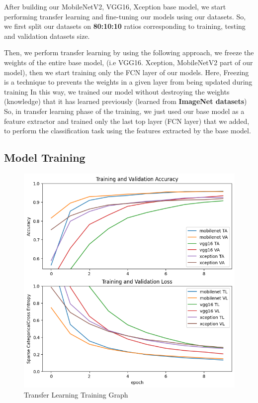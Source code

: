 After building our MobileNetV2, VGG16, Xception base model, we start performing transfer learning and fine-tuning our models using our datasets. So, we first split our datasets on \textbf{80:10:10} ratios corresponding to training, testing and validation datasets size.\par\vspace{1em}

Then, we perform transfer learning by using the following approach, we freeze the weights of the entire base model, (i.e VGG16. Xception, MobileNetV2 part of our model), then we start training only the FCN layer of our models. Here, Freezing is a technique to prevents the weights in a given layer from being updated during training In this way, we trained our model without destroying the weights (knowledge) that it has learned previously (learned from \textbf{ImageNet datasets})\\
So, in transfer learning phase of the training, we just used our base model as a feature extractor and trained only the last top layer (FCN layer) that we added, to perform the classification task using the features extracted by the base model. 


\subsection{Model Training}

\begin{figure}
    \centering
    \includegraphics[width=1\linewidth]{graphics//chapter5/transfer learning training.png}
    \caption{Transfer Learning Training Graph}
    \label{fig:transfer-learning-training}
\end{figure}


